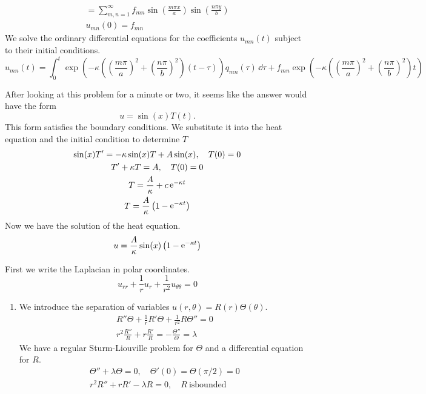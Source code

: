 {\begin{Solution}
\begin{gather*}
    = \sum_{m,n = 1}^\infty f_{mn} \sin \left( \frac{m \pi x}{a} \right)
    \sin \left( \frac{n \pi y}{b} \right)
    \\
    u_{mn}(0) = f_{mn}
  \end{gather*}
  We solve the ordinary differential equations for the coefficients $u_{mn}(t)$
  subject to their initial conditions.
  \[
  u_{mn}(t) = 
  \int_0^t \exp \left( - \kappa \left( \left( \frac{m \pi}{a} \right)^2 + 
      \left( \frac{n \pi}{b} \right)^2 \right) (t - \tau) \right) q_{mn}(\tau) \,\dd \tau
  + f_{mn} \exp \left( - \kappa \left( \left( \frac{m \pi}{a} \right)^2 + 
      \left( \frac{n \pi}{b} \right)^2 \right) t \right)
  \]
\end{Solution}









\begin{Solution}
  \label{solution radiated half pipe}
  After looking at this problem for a minute or two, it seems like the answer
  would have the form
  \[
  u = \sin(x) T(t).
  \]
  This form satisfies the boundary conditions.  We substitute it into 
  the heat equation and the initial condition to determine $T$
  \begin{gather*}
    \sin(x) T' = - \kappa \sin(x) T + A \sin(x), \quad T(0) = 0
    \\
    T' + \kappa T = A, \quad T(0) = 0
    \\
    T = \frac{A}{\kappa} + c \mathop{\mathrm{e}}\nolimits^{-\kappa t}
    \\
    T = \frac{A}{\kappa} \left(1 - \mathop{\mathrm{e}}\nolimits^{-\kappa t} \right)
  \end{gather*}
  Now we have the solution of the heat equation.
  \[
  u = \frac{A}{\kappa} \sin(x) \left(1 - \mathop{\mathrm{e}}\nolimits^{-\kappa t} \right)
  \]
\end{Solution}






\begin{Solution}
  \label{solution laplace quarter circe two bc}
  First we write the Laplacian in polar coordinates.
  \[
  u_{r r} + \frac{1}{r} u_r + \frac{1}{r^2} u_{\theta \theta} = 0
  \]
  \begin{enumerate}
  \item
    We introduce the separation of variables $u(r, \theta) = R(r) \Theta(\theta)$.
    \begin{gather*}
      R'' \Theta + \frac{1}{r} R' \Theta + \frac{1}{r^2} R \Theta'' = 0
      \\
      r^2 \frac{R''}{R} + r \frac{R'}{R} = - \frac{\Theta''}{\Theta} = \lambda
    \end{gather*}
    We have a regular Sturm-Liouville problem for $\Theta$ and a differential 
    equation for $R$.
    \begin{gather}
      \label{eqn T''+lT=0, T'=T=0}
      \Theta'' + \lambda \Theta = 0, \quad \Theta'(0) = \Theta(\pi/2) = 0
      \\
      \nonumber
      r^2 R'' + r R' - \lambda R = 0, \quad R\ \mathrm{is bounded}
    \end{gather}


\end{enumerate}
\end{Solution}}
